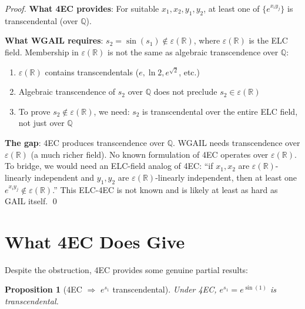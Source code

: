 \documentclass[11pt]{article}
\newtheorem{proposition}[theorem]{Proposition}
\begin{document}
\begin{proof}
\textbf{What 4EC provides}: For suitable $x_1, x_2, y_1, y_2$, at least one of
$\{e^{x_i y_j}\}$ is transcendental (over $\mathbb{Q}$).

\textbf{What WGAIL requires}: $s_2 = \sin(s_1) \notin \varepsilon(\mathbb{R})$,
where $\varepsilon(\mathbb{R})$ is the ELC field. Membership in $\varepsilon(\mathbb{R})$
is not the same as algebraic transcendence over $\mathbb{Q}$:
\begin{enumerate}
  \item $\varepsilon(\mathbb{R})$ contains transcendentals ($e, \ln 2, e^{\sqrt{2}}$, etc.)
  \item Algebraic transcendence of $s_2$ over $\mathbb{Q}$ does not preclude $s_2 \in \varepsilon(\mathbb{R})$
  \item To prove $s_2 \notin \varepsilon(\mathbb{R})$, we need: $s_2$ is transcendental
    over the entire ELC field, not just over $\mathbb{Q}$
\end{enumerate}

\textbf{The gap}: 4EC produces transcendence over $\mathbb{Q}$.
WGAIL needs transcendence over $\varepsilon(\mathbb{R})$ (a much richer field).
No known formulation of 4EC operates over $\varepsilon(\mathbb{R})$.
To bridge, we would need an ELC-field analog of 4EC: ``if $x_1, x_2$ are
$\varepsilon(\mathbb{R})$-linearly independent and $y_1, y_2$ are
$\varepsilon(\mathbb{R})$-linearly independent, then at least one $e^{x_i y_j} \notin \varepsilon(\mathbb{R})$.''
This ELC-4EC is not known and is likely at least as hard as GAIL itself. \qed
\end{proof}

\section{What 4EC Does Give}

Despite the obstruction, 4EC provides some genuine partial results:

\begin{proposition}[4EC $\Rightarrow$ $e^{s_1}$ transcendental]
Under 4EC, $e^{s_1} = e^{\sin(1)}$ is transcendental.
\end{proposition}
\end{document}
